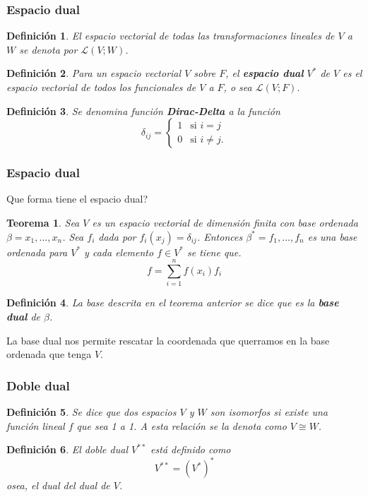 \documentclass{beamer}
\newtheorem{teo}{Teorema}
\newtheorem{defi}{Definición}
\begin{document}
\begin{frame}
    \frametitle{Espacio dual}
    \begin{defi}
        El espacio vectorial de todas las transformaciones lineales de $V$ a $W$ se denota por $\mathcal{L}(V;W)$.
    \end{defi}
\pause
    \begin{defi}
        Para un espacio vectorial $V$ sobre $F$, el \textbf{espacio dual} $V^*$ de $V$ es el espacio
        vectorial de todos los funcionales de $V$ a $F$, o sea $\mathcal{L}(V;F).$
    \end{defi}
\pause
    \begin{defi}
        Se denomina función \textbf{Dirac-Delta} a la función
        $$
        \delta_{ij}=
            \begin{cases}
             1& \text{si } i=j\\
             0& \text{si } i \neq j.
            \end{cases}
        $$
    \end{defi}
\end{frame}
\begin{frame}
    \frametitle{Espacio dual}
    Que forma tiene el espacio dual?
    \begin{teo}
        Sea $V$ es un espacio vectorial de dimensión finita con base ordenada $\beta = {x_1,...,x_n}$.
        Sea $f_i$ dada por $f_i(x_j) = \delta_{ij}$. Entonces $\beta^* = {f_1,...,f_n}$ es una 
        base ordenada para $V^*$ y cada elemento $f \in V^*$ se tiene que.
        $$
        f = \sum_{i=1}^n f(x_i)f_i
        $$
    \end{teo}
\pause
    \begin{defi}
        La base descrita en el teorema anterior se dice que es la \textbf{base dual} de $\beta$.
    \end{defi}
\end{frame}
\begin{frame}
    La base dual nos permite rescatar la coordenada que querramos en la base ordenada que tenga $V$.
\end{frame}
\begin{frame}
    \frametitle{Doble dual}
    \begin{defi}
        Se dice que dos espacios $V$ y $W$ son isomorfos si existe una función lineal $f$ que sea 1 a 1.
        A esta relación se la denota como $V \cong W$.
    \end{defi}
\pause
    \begin{defi}
        El doble dual $V^{**}$ está definido como
        $$
        V^{**} = (V^*)^*
        $$
        osea, el dual del dual de $V$.
    \end{defi}
\end{frame}
\end{document}
